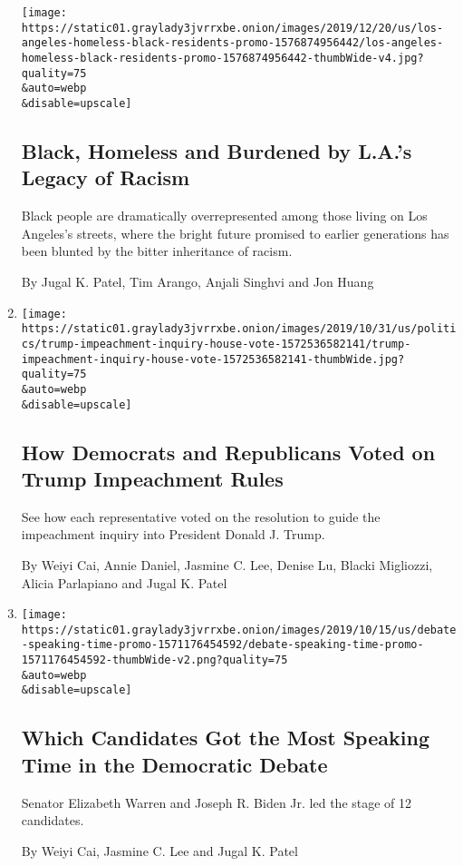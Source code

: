 \begin{enumerate}
  \texttt{[image: https://static01.graylady3jvrrxbe.onion/images/2019/12/20/us/los-angeles-homeless-black-residents-promo-1576874956442/los-angeles-homeless-black-residents-promo-1576874956442-thumbWide-v4.jpg?quality=75\\\&auto=webp\\\&disable=upscale]}

  \hypertarget{black-homeless-and-burdened-by-las-legacy-of-racism}{%
  \subsection{Black, Homeless and Burdened by L.A.'s Legacy of
  Racism}\label{black-homeless-and-burdened-by-las-legacy-of-racism}}

  Black people are dramatically overrepresented among those living on
  Los Angeles's streets, where the bright future promised to earlier
  generations has been blunted by the bitter inheritance of racism.

  By Jugal K. Patel, Tim Arango, Anjali Singhvi and Jon Huang
\item
  \href{/interactive/2019/10/31/us/politics/trump-impeachment-inquiry-house-vote.html}{}

  \texttt{[image: https://static01.graylady3jvrrxbe.onion/images/2019/10/31/us/politics/trump-impeachment-inquiry-house-vote-1572536582141/trump-impeachment-inquiry-house-vote-1572536582141-thumbWide.jpg?quality=75\\\&auto=webp\\\&disable=upscale]}

  \hypertarget{how-democrats-and-republicans-voted-on-trump-impeachment-rules}{%
  \subsection{How Democrats and Republicans Voted on Trump Impeachment
  Rules}\label{how-democrats-and-republicans-voted-on-trump-impeachment-rules}}

  See how each representative voted on the resolution to guide the
  impeachment inquiry into President Donald J. Trump.

  By Weiyi Cai, Annie Daniel, Jasmine C. Lee, Denise Lu, Blacki
  Migliozzi, Alicia Parlapiano and Jugal K. Patel
\item
  \href{/interactive/2019/10/15/us/elections/debate-speaking-time.html}{}

  \texttt{[image: https://static01.graylady3jvrrxbe.onion/images/2019/10/15/us/debate-speaking-time-promo-1571176454592/debate-speaking-time-promo-1571176454592-thumbWide-v2.png?quality=75\\\&auto=webp\\\&disable=upscale]}

  \hypertarget{which-candidates-got-the-most-speaking-time-in-the-democratic-debate}{%
  \subsection{Which Candidates Got the Most Speaking Time in the
  Democratic
  Debate}\label{which-candidates-got-the-most-speaking-time-in-the-democratic-debate}}

  Senator Elizabeth Warren and Joseph R. Biden Jr. led the stage of 12
  candidates.

  By Weiyi Cai, Jasmine C. Lee and Jugal K. Patel
\end{enumerate}

